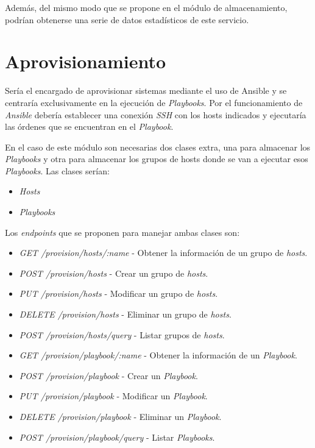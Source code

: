 \bigskip
Además, del mismo modo que se propone en el módulo de almacenamiento, podrían obtenerse una serie de datos estadísticos de este servicio.





\section{Aprovisionamiento}
\label{sec:provisioncap6}

Sería el encargado de aprovisionar sistemas mediante el uso de Ansible y se centraría exclusivamente en la ejecución de \textit{Playbooks}. Por el funcionamiento de \textit{Ansible} debería establecer una conexión \textit{SSH} con los hosts indicados y ejecutaría las órdenes que se encuentran en el \textit{Playbook}.

En el caso de este módulo son necesarias dos clases extra, una para almacenar los \textit{Playbooks} y otra para almacenar los grupos de hosts donde se van a ejecutar esos \textit{Playbooks}. Las clases serían:
\begin{itemize}
	\item \textit{Hosts}
	\item \textit{Playbooks}
\end{itemize}


\bigskip
Los \textit{endpoints} que se proponen para manejar ambas clases son:
\begin{itemize}
	\item \textit{GET /provision/hosts/:name} - Obtener la información de un grupo de \textit{hosts}.
	\item \textit{POST /provision/hosts} - Crear un grupo de \textit{hosts}.
	\item \textit{PUT /provision/hosts} - Modificar un grupo de \textit{hosts}.
	\item \textit{DELETE /provision/hosts} - Eliminar un grupo de \textit{hosts}.
	\item \textit{POST /provision/hosts/query} - Listar grupos de \textit{hosts}.
	\item \textit{GET /provision/playbook/:name} - Obtener la información de un \textit{Playbook}.
	\item \textit{POST /provision/playbook} - Crear un \textit{Playbook}.
	\item \textit{PUT /provision/playbook} - Modificar un \textit{Playbook}.
	\item \textit{DELETE /provision/playbook} - Eliminar un \textit{Playbook}.
	\item \textit{POST /provision/playbook/query} - Listar \textit{Playbooks}.
\end{itemize}

